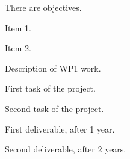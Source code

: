 \begin{workpackage}[id=WP1,wphases=0-48,
  short=First WP,%
  title=First Work Package,
  lead=KUL,
  KULRM=12,
  PAR2RM=6,
  PAR3RM=24]

\begin{wpobjectives}
  There are objectives.
  \begin{compactitem}
  \item Item 1.
  \item Item 2.
  \end{compactitem}
\end{wpobjectives}

\begin{wpdescription}
  Description of WP1 work.
\end{wpdescription}

\begin{tasklist}

  \begin{task}[title=TASK1,id=task1,PM=15,lead=KUL,wphases=0-30!0.5]

    First task of the project.
    
  \end{task}

  \begin{task}[title=TASK2,id=task2,PM=15,lead=PAR2,wphases=12-42!0.5]

    Second task of the project.
    
  \end{task}

\end{tasklist}

\begin{wpdelivs}
  \begin{wpdeliv}[due=12,id=mydeliv1,dissem=PU,nature=DEM,lead=KUL]
      {First deliverable, after 1 year.}
  \end{wpdeliv}
  \begin{wpdeliv}[due=24,id=mydeliv2,dissem=PU,nature=DEM,lead=PAR2]
      {Second deliverable, after 2 years.}
\end{wpdeliv}
\end{wpdelivs}

\end{workpackage}
